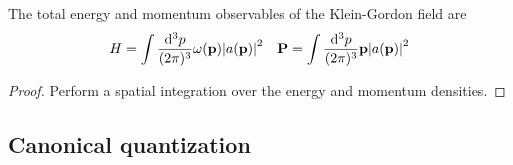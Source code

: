 \begin{lemma}
	The total energy and momentum observables of the Klein-Gordon field are
	\begin{align}
		H
		=
		\int\frac{\dd[3]{p}}{(2\pi)^3}
		\omega(\vb{p})\abs{a(\vb{p})}^2
		&&
		\vb{P}
		=
		\int\frac{\dd[3]{p}}{(2\pi)^3}
		\vb{p}\abs{a(\vb{p})}^2
	\end{align}
\end{lemma}
\begin{proof}
	Perform a spatial integration over the energy and momentum densities.
\end{proof}

\subsection{Canonical quantization}


